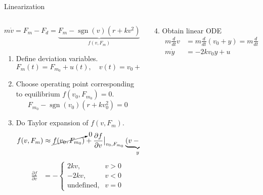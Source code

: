 \documentclass[dvisvgm,hypertex,aspectratio=169]{beamer}
\DeclareMathOperator{\sign}{sgn}
\begin{document}
\begin{frame}[label=L2A]{Linearization}
  \footnotesize
  \begin{columns}
    \begin{column}{0.6\columnwidth}
      \[ m \dot{v} = F_m - F_d = \underbrace{F_m - \sign(v)(r + kv^2)}_{f(v, F_m)} = f(v, F_m)\]
      \begin{enumerate}
         \item Define deviation variables.
        \[ F_m(t) = F_{m_0} + u(t), \quad v(t) = v_0 + y(t)\]
        \pause
      \item Choose operating point corresponding to equilibrium \(f(v_0, F_{m_0}) = 0\).
        \[ F_{m_0} -  \sign(v_0)(r + kv_0^2) = 0\]
        \pause
      \item  Do Taylor expansion of \(f(v, F_m)\).
        \begin{align*}
        f(v, F_m) &\approx \cancelto{0}{f(v_0, F_{m_0})} + \frac{\partial f}{\partial v}\big|_{v_0, F_{m_0}} \underbrace{(v - v_0)}_{y} + \frac{\partial f}{\partial F_m}\big|_{v_0, F_{m_0}} \underbrace{(F_m - F_{m_0})}_{u} 
      \end{align*}
      \pause
      \begin{align*}
        \frac{\partial f}{\partial v} &= -\begin{cases} 2kv, & v>0\\-2kv, & v<0\\\text{undefined}, & v=0 \end{cases}
      \end{align*}
    \end{enumerate}
  \end{column}
  \begin{column}{0.4\columnwidth}
    \pause
    \begin{enumerate}
      \setcounter{enumi}{3}
    \item Obtain linear ODE
      \begin{align*}
        m\frac{d}{dt} v &= m\frac{d}{dt} (v_0 + y) = m\frac{d}{dt} y = F_m - F_d
                          \approx u - 2kv_0y\\
        m\dot{y} &= -2kv_0y + u
      \end{align*}
    \end{enumerate}

    \pause
    
           

\end{column}
\end{columns}
\end{frame}
\end{document}
